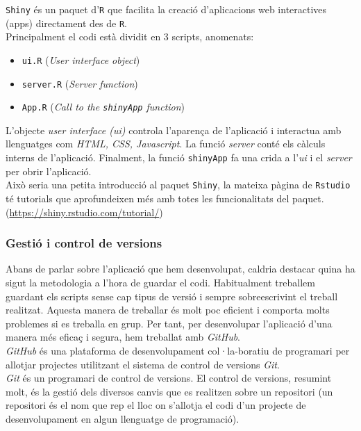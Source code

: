\documentclass[english]{article}
\begin{document}
\texttt{Shiny} és un paquet d'\texttt{R} que facilita la creació d'aplicacions web interactives (apps) directament des de \texttt{R}.
\\

Principalment el codi està dividit en 3 scripts, anomenats:
\begin{itemize}
\item \texttt{ui.R} (\textit{User interface object})
\item \texttt{server.R} (\textit{Server function})
\item \texttt{App.R} (\textit{Call to the \texttt{shinyApp} function})
\end{itemize}
L'objecte \textit{user interface (ui)} controla l'aparen\c{c}a de l'aplicació i interactua amb llenguatges com \textit{HTML, CSS, Javascript}. La funció \textit{server} conté els càlculs interns de l'aplicació. Finalment, la funció \texttt{shinyApp} fa una crida a l'\textit{ui} i el \textit{server} per obrir l'aplicació.
\\

Això seria una petita introducció al paquet \texttt{Shiny}, la mateixa pàgina de \texttt{Rstudio} té tutorials que aprofundeixen més amb totes les funcionalitats del paquet. (\url{https://shiny.rstudio.com/tutorial/})

\subsubsection{Gestió i control de versions}
Abans de parlar sobre l'aplicació que hem desenvolupat, caldria destacar quina ha sigut la metodologia a l'hora de guardar el codi. Habitualment treballem guardant els scripts sense cap tipus de versió i sempre sobreescrivint el treball realitzat. Aquesta manera de treballar és molt poc eficient i comporta molts problemes si es treballa en grup. Per tant, per desenvolupar l'aplicació d'una manera més efica\c{c} i segura, hem treballat amb \textit{GitHub}.
\\

\textit{GitHub} és una plataforma de desenvolupament col·la-boratiu de programari per allotjar projectes utilitzant el sistema de control de versions \textit{Git}.
\\

\textit{Git} és un programari de control de versions. El control de versions, resumint molt, és la gestió dels diversos canvis que es realitzen sobre un repositori (un repositori és el nom que rep el lloc on s'allotja el codi d'un projecte de desenvolupament en algun llenguatge de programació).
\end{document}
